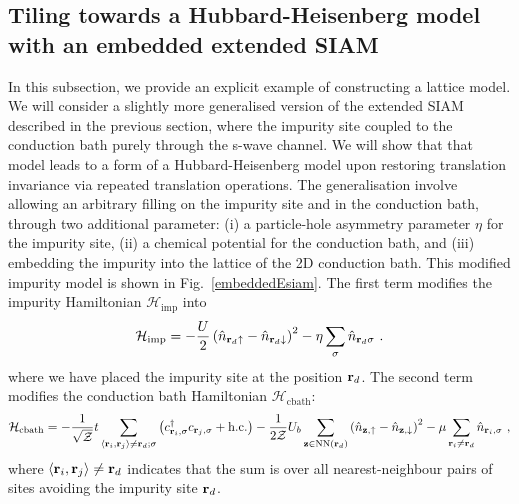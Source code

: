 \documentclass[reprint,hidelinks,onecolumn]{revtex4-2}
\begin{document}
\subsection{Tiling towards a Hubbard-Heisenberg model with an embedded extended SIAM}
In this subsection, we provide an explicit example of constructing a lattice model. We will consider a slightly more generalised version of the extended SIAM described in the previous section, where the impurity site coupled to the conduction bath purely through the s-wave channel. We will show that that model leads to a form of a Hubbard-Heisenberg model upon restoring translation invariance via repeated translation operations. The generalisation involve allowing an arbitrary filling on the impurity site and in the conduction bath, through two additional parameter: (i) a particle-hole asymmetry parameter \(\eta\) for the impurity site, (ii) a chemical potential for the conduction bath, and (iii) embedding the impurity into the lattice of the 2D conduction bath. This modified impurity model is shown in Fig.~\ref{embeddedEsiam}. The first term modifies the impurity Hamiltonian \(\mathcal{H}_\text{imp}\) into
\begin{equation}\begin{aligned}\label{onsiteHamiltonian}
	\mathcal{H}_\text{imp} = -\frac{U}{2}\left(\hat n_{{\bf r}_d \uparrow} - \hat n_{{\bf r}_d \downarrow} \right)^2 - \eta\sum_\sigma \hat n_{{\bf r}_d\sigma}~.
\end{aligned}\end{equation}
where we have placed the impurity site at the position \({\bf r}_d\). The second term modifies the conduction bath Hamiltonian \(\mathcal{H}_\text{cbath}\):
\begin{equation}\begin{aligned}\label{bathHamiltonian}
	\mathcal{H}_\text{cbath} = -\frac{1}{\sqrt\mathcal{Z}}t\sum_{\left<{\bf r}_i, {\bf r}_j\right>\neq{\bf r}_d;\sigma}\left(c^\dagger_{{\bf r}_i,\sigma}c_{{\bf r}_j,\sigma} + \text{h.c.}\right) - \frac{1}{2 \mathcal{Z}}U_b\sum_{{\bf z}\in\text{NN}({\bf r}_d)}\left(\hat n_{{\bf z}, \uparrow} - \hat n_{{\bf z}, \downarrow}\right)^2 - \mu \sum_{{\bf r}_i \neq {\bf r}_d}\hat n_{{\bf r}_i,\sigma}~,
\end{aligned}\end{equation}
where \(\left<{\bf r}_i, {\bf r}_j\right>\neq {\bf r}_d\) indicates that the sum is over all nearest-neighbour pairs of sites avoiding the impurity site \({\bf r}_d\).
\end{document}
